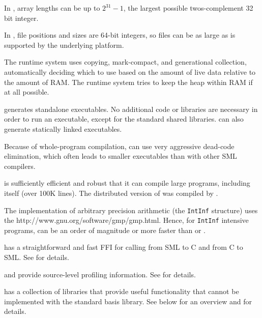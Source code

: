 \begin{description}
In {\mlton}, array lengths can be up to $2^{31} - 1$, the largest possible
twos-complement 32 bit integer.

In {\mlton}, file positions and sizes are 64-bit integers, so files
can be as large as is supported by the underlying platform.

The {\mlton} runtime system uses copying, mark-compact, and generational
collection, automatically deciding which to use based on the amount of live
data relative to the amount of RAM.  The runtime system tries to keep the heap
within RAM if at all possible.

{\mlton} generates standalone executables.  No additional code or
libraries are necessary in order to run an executable, except for
the standard shared libraries.  {\mlton} can also generate statically
linked executables.

Because of whole-program compilation, {\mlton} can use very aggressive 
dead-code elimination, which often leads to smaller executables than
with other SML compilers.

{\mlton} is sufficiently efficient and robust that it can compile
large programs, including itself (over 100K lines).  The distributed
version of {\mlton} was compiled by {\mlton}.

The {\mlton} implementation of arbitrary precision arithmetic (the
{\tt IntInf} structure) uses the
		  {http://www.gnu.org/software/gmp/gmp.html}.
Hence, for {\tt IntInf} intensive programs, {\mlton} can be an order
of magnitude or more faster than {\poly} or {\smlnj}.

{\mlton} has a straightforward and fast FFI for calling from SML to C
and from C to SML.  See  for details.

{\mlton} and {\mlprof} provide source-level profiling information.
See  for details.

{\mlton} has a collection of libraries that provide useful functionality that
cannot be implemented with the standard basis library.  See below for an
overview and  for details.


\end{description}
